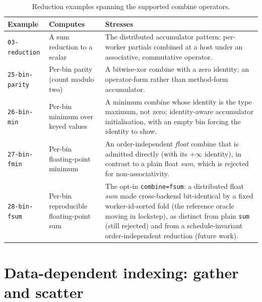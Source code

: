\begin{table}[htbp]
  \centering
  \small
  \begin{tabular}{@{}p{}p{}p{}@{}}
    \toprule
    Example & Computes & Stresses \\
    \midrule
    \texttt{03-reduction} & A sum reduction to a scalar & The distributed
      accumulator pattern: per-worker partials combined at a host under an
      associative, commutative operator. \\
    \texttt{25-bin-parity} & Per-bin parity (count modulo two) & A bitwise-xor
      combine with a zero identity; an operator-form rather than method-form
      accumulator. \\
    \texttt{26-bin-min} & Per-bin minimum over keyed values & A minimum combine
      whose identity is the type maximum, not zero; identity-aware accumulator
      initialisation, with an empty bin forcing the identity to show. \\
    \texttt{27-bin-fmin} & Per-bin floating-point minimum & An order-independent
      \emph{float} combine that is admitted directly (with its $+\infty$ identity),
      in contrast to a plain float \emph{sum}, which is rejected for
      non-associativity. \\
    \texttt{28-bin-fsum} & Per-bin reproducible floating-point sum & The opt-in
      \texttt{combine=fsum}: a distributed float \emph{sum} made cross-backend
      bit-identical by a fixed worker-id-sorted fold (the reference oracle moving in
      lockstep), as distinct from plain \texttt{sum} (still rejected) and from a
      schedule-invariant order-independent reduction (future work). \\
    \bottomrule
  \end{tabular}
  \caption{Reduction examples spanning the supported combine operators.}
  \label{tab:examples-reduction}
\end{table}

\section{Data-dependent indexing: gather and scatter}

